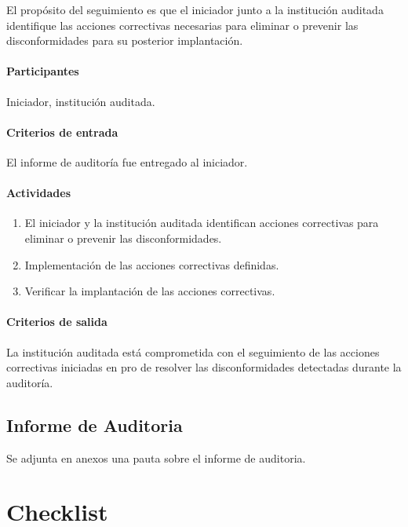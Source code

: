 El propósito del seguimiento es que el iniciador junto a la institución auditada identifique las acciones correctivas necesarias para eliminar o prevenir las disconformidades para su posterior implantación.

\paragraph{Participantes\\}

Iniciador, institución auditada.

\paragraph{Criterios de entrada\\}

El informe de auditoría fue entregado al iniciador.

\paragraph{Actividades}

\begin{enumerate}
	\item
		El iniciador y la institución auditada identifican acciones correctivas para eliminar o prevenir las disconformidades.
	\item
		Implementación de las acciones correctivas definidas.
	\item
		Verificar la implantación de las acciones correctivas.
\end{enumerate}

\paragraph{Criterios de salida\\}

La institución auditada está comprometida con el seguimiento de las acciones correctivas iniciadas en pro de resolver las disconformidades detectadas durante la auditoría.

\subsection{Informe de Auditoria}

Se adjunta en anexos una pauta sobre el informe de auditoria.

\section{Checklist}

